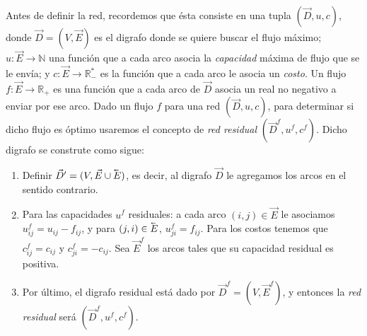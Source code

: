 \documentclass[10pt]{article}
\newcommand{\R}{\mathbb R}
\newcommand{\N}{\mathbb N}
\newcommand{\cev}[1]{\reflectbox{\ensuremath{\vec{\reflectbox{\ensuremath{#1}}}}}}
\theoremstyle{plain}
\theoremstyle{definition}
\begin{document}
Antes de definir la red, recordemos que ésta consiste en una tupla $(\vec{D}, u, c)$, donde $\vec{D} = (V, \vec{E})$ es el digrafo donde se quiere buscar el flujo máximo; $u: \vec{E} \to \N$ una función que a cada arco asocia la \textit{capacidad} máxima de flujo que se le envía; y $c:\vec{E} \to \R_-^*$ es la función que a cada arco le asocia un \textit{costo}. Un flujo $f:\vec{E} \to \R_+$ es una función que a cada arco de $\vec{D}$ asocia un real no negativo a enviar por ese arco.
Dado un flujo $f$ para una red $(\vec{D}, u, c)$, para determinar si dicho flujo es óptimo usaremos el concepto de \textit{red residual} $(\vec{D}^f, u^f,c^f)$. Dicho digrafo se construte como sigue: 
\begin{enumerate}
\item Definir $\vec{D}' = (V, \vec{E} \cup \cev{E})$, es decir, al digrafo $\vec{D}$ le agregamos los arcos en el sentido contrario.

\item  Para las capacidades $u^f$ residuales: a cada arco $(i,j) \in \vec{E}$ le asociamos $u^f_{ij} = u_{ij}-f_{ij}$, y para $(j,i) \in \cev{E}$, $u^f_{ji} = f_{ij}$.  Para los costos tenemos que $c^f_{ij} = c_{ij}$ y $c^f_{ji} = -c_{ij}$. Sea $\vec{E}^f$ los arcos tales que su capacidad residual es positiva.

\item Por último, el digrafo residual está dado por $\vec{D}^f = (V, \vec{E}^f)$, y entonces la \textit{red residual} será $(\vec{D}^f, u^f, c^f)$. 
\end{enumerate}  


\end{document}
